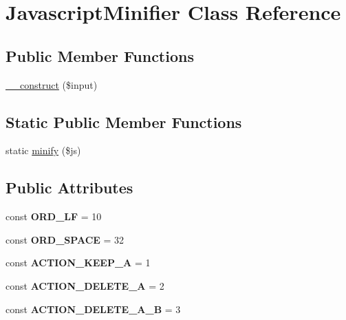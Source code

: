 \hypertarget{classJavascriptMinifier}{
\section{JavascriptMinifier Class Reference}
\label{classJavascriptMinifier}
}
\subsection*{Public Member Functions}
\begin{DoxyCompactItemize}
\item 
\hyperlink{classJavascriptMinifier_a3758aa5599a06cb1365171b4ef7cb818}{\_\-\_\-construct} (\$input)
\end{DoxyCompactItemize}
\subsection*{Static Public Member Functions}
\begin{DoxyCompactItemize}
\item 
static \hyperlink{classJavascriptMinifier_ab08f36fceb7761733428ba4ce9375b71}{minify} (\$js)
\end{DoxyCompactItemize}
\subsection*{Public Attributes}
\begin{DoxyCompactItemize}
\item 
\hypertarget{classJavascriptMinifier_ab3d7012685e09316205d63d27d3f3715}{
const {\bfseries ORD\_\-LF} = 10}
\label{classJavascriptMinifier_ab3d7012685e09316205d63d27d3f3715}

\item 
\hypertarget{classJavascriptMinifier_aa2cb2f93715ab17167ed6effac4df3f5}{
const {\bfseries ORD\_\-SPACE} = 32}
\label{classJavascriptMinifier_aa2cb2f93715ab17167ed6effac4df3f5}

\item 
\hypertarget{classJavascriptMinifier_af19b7dc3dd3794956f4f1710d306db40}{
const {\bfseries ACTION\_\-KEEP\_\-A} = 1}
\label{classJavascriptMinifier_af19b7dc3dd3794956f4f1710d306db40}

\item 
\hypertarget{classJavascriptMinifier_a279c988a51775a78a7ed74a80823eff3}{
const {\bfseries ACTION\_\-DELETE\_\-A} = 2}
\label{classJavascriptMinifier_a279c988a51775a78a7ed74a80823eff3}

\item 
\hypertarget{classJavascriptMinifier_a681e3ae54992142a355e3d3833e8aec2}{
const {\bfseries ACTION\_\-DELETE\_\-A\_\-B} = 3}
\label{classJavascriptMinifier_a681e3ae54992142a355e3d3833e8aec2}

\end{DoxyCompactItemize}
